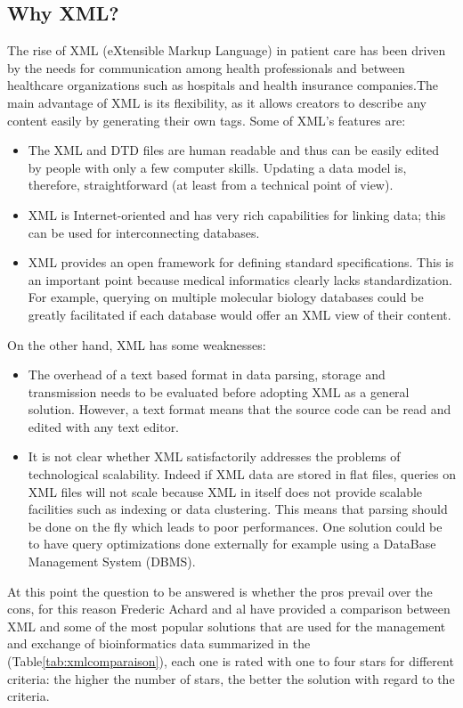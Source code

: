 \subsection{Why XML?}
The rise of XML (eXtensible Markup Language) in patient care has been driven by the needs for communication among health professionals and between healthcare organizations such as hospitals and health insurance companies.The main advantage of XML is its flexibility, as it allows creators to describe any content easily by generating their own tags\cite{thuy2012s}. Some of XML’s features are\cite{achard2001xml}:
\begin{itemize}
\item The XML and DTD files are human readable and thus can be easily edited by people with only a few computer skills. Updating a data model is, therefore, straightforward (at least from a technical point of view).
\item XML is Internet-oriented and has very rich capabilities for linking data; this can be used for interconnecting databases.
\item XML provides an open framework for defining standard specifications. This is an important point because medical informatics clearly lacks standardization. For example, querying on multiple molecular biology databases could be greatly facilitated if each database would offer an XML view of their content.
\end{itemize}
On the other hand, XML has some weaknesses:
\begin{itemize}
\item The overhead of a text based format in data parsing, storage and transmission needs to be evaluated before adopting XML as a general solution. However, a text format means that the source code can be read and edited with any text editor.
\item It is not clear whether XML satisfactorily addresses the problems of technological scalability. Indeed if XML data are stored in flat files, queries on XML files will not scale because XML in itself does not provide scalable facilities such as indexing or data clustering. This means that parsing should be done on the fly which leads to poor performances. One solution could be to have query optimizations done externally for example using a DataBase Management System (DBMS).
\end{itemize}
\newpage
At this point the question to be answered is whether the pros prevail over the cons, for this reason Frederic Achard and al\cite{achard2001xml}  have provided a comparison between XML and some of the most popular solutions that are used for the management and exchange of bioinformatics data summarized in the (Table\ref{tab:xmlcomparaison}), each one is rated with one to four stars for different criteria: the higher the number of stars, the better the solution with regard to the criteria.

